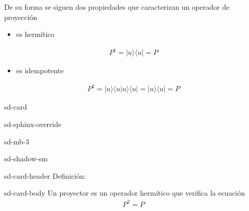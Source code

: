 \documentclass[letterpaper,10pt,english]{jupyterBook}
\newcommand{\bra}[1]{\langle #1|}
\newcommand{\ket}[1]{|#1\rangle}
\newcommand{\braket}[2]{\langle #1|#2\rangle}
\newcommand{\ketbra}[2]{| #1\rangle \langle #2 |}
\begin{document}
\sphinxAtStartPar
De su forma se siguen dos propiedades que caracterizan un operador de proyección
\begin{itemize}
\item {} 
\sphinxAtStartPar
es hermítico

\end{itemize}
\begin{equation*}
\begin{split}
P^\dagger = \ketbra{u}{u} = P
\end{split}
\end{equation*}\begin{itemize}
\item {} 
\sphinxAtStartPar
es idempotente

\end{itemize}
\begin{equation*}
\begin{split}
P^2 = \ket{u}\braket{u}{u}\bra{u} = \ketbra{u}{u} = P
\end{split}
\end{equation*}
\begin{sphinxuseclass}{sd-card}
\begin{sphinxuseclass}{sd-sphinx-override}
\begin{sphinxuseclass}{sd-mb-3}
\begin{sphinxuseclass}{sd-shadow-sm}
\begin{sphinxuseclass}{sd-card-header}
\sphinxAtStartPar
Definición:

\end{sphinxuseclass}
\begin{sphinxuseclass}{sd-card-body}
\sphinxAtStartPar
Un proyector es un operador hermítico que verifica la ecuación
\begin{equation*}
\begin{split}
P^2 = P
\end{split}
\end{equation*}
\end{sphinxuseclass}
\end{sphinxuseclass}
\end{sphinxuseclass}
\end{sphinxuseclass}
\end{sphinxuseclass}
\end{document}
